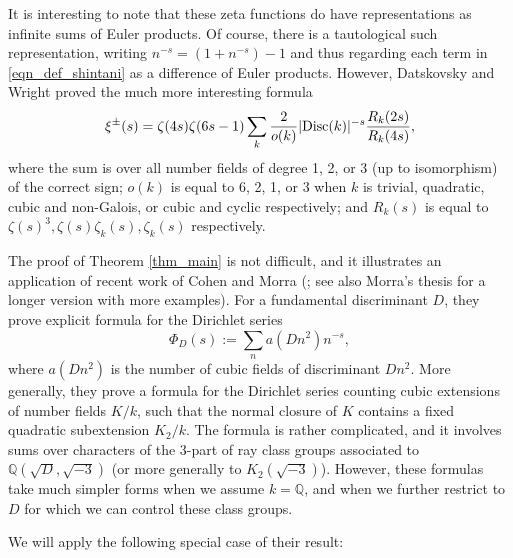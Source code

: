 \documentclass[12pt]{amsart}
\theoremstyle{remark}
\numberwithin{theorem}{section} \numberwithin{equation}{section}
\newcommand{\Q}{\mathbb{Q}}
\newcommand{\Disc}{\textnormal{Disc}}
\begin{document}
It is interesting to note that these zeta functions do have representations as infinite sums of Euler
products. Of course, there is a tautological such representation, writing
$n^{-s} = (1 + n^{-s}) - 1$
and thus regarding each term in \eqref{eqn_def_shintani} as a difference of Euler products.
However, Datskovsky and Wright \cite{DW2} proved the much more interesting formula
\begin{equation}\label{eqn_dw2}
\xi^{\pm}(s) = \zeta(4s) \zeta(6s - 1) \sum_k \frac{2}{o(k)} |\Disc(k)|^{-s} \frac{R_k(2s)}{R_k(4s)},
\end{equation}
where the sum is over all number fields of degree 1, 2, or 3 (up to isomorphism) of the correct sign; $o(k)$ is equal to
6, 2, 1, or 3 when $k$ is trivial, quadratic, cubic and non-Galois, or cubic and cyclic respectively;
and $R_k(s)$ is equal
to $\zeta(s)^3, \zeta(s) \zeta_k(s), \zeta_k(s)$ respectively.

The proof of Theorem \ref{thm_main} is not difficult, and it illustrates an application
of recent work of Cohen and Morra (\cite{CM}; see also Morra's thesis \cite{M} for a longer version with more examples). 
For a fundamental discriminant $D$, 
they prove explicit formula for the Dirichlet series
\begin{equation}
\Phi_D(s) := \sum_n a(Dn^2) n^{-s},
\end{equation}
where $a(Dn^2)$ is the number of cubic fields of discriminant $D n^2$. More generally, they prove
a formula for the Dirichlet series counting cubic extensions of number fields 
$K/k$, such that the normal
closure of $K$ contains a fixed quadratic subextension $K_2/k$. The formula is rather complicated, and it
involves sums over characters of the 3-part of ray class groups associated to $\Q(\sqrt{D}, \sqrt{-3})$
(or more generally to $K_2(\sqrt{-3})$). However, these formulas take much simpler forms when we assume $k = \Q$, and when
we further restrict
to $D$ for which we can control these class groups.

We will apply the following special case of their result:
\end{document}
